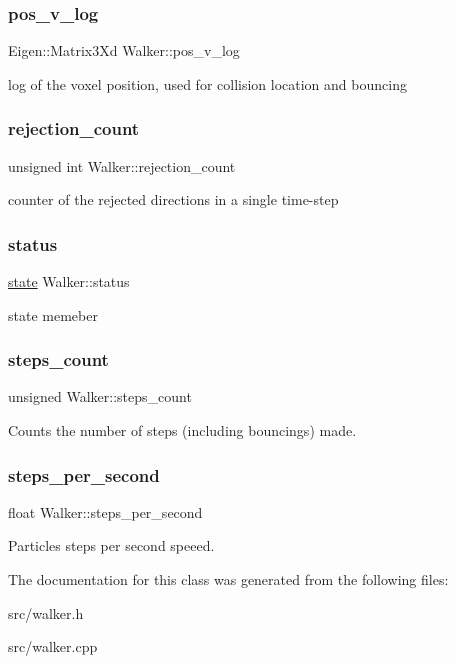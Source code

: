 \subsubsection{\texorpdfstring{pos\+\_\+v\+\_\+log}{pos\_v\_log}}
{\footnotesize\ttfamily Eigen\+::\+Matrix3\+Xd Walker\+::pos\+\_\+v\+\_\+log}

log of the voxel position, used for collision location and bouncing \mbox{\label{class_walker_a38669698192d39146c77011b69b1e372}} 
\subsubsection{\texorpdfstring{rejection\+\_\+count}{rejection\_count}}
{\footnotesize\ttfamily unsigned int Walker\+::rejection\+\_\+count}

counter of the rejected directions in a single time-\/step \mbox{\label{class_walker_afa37629b74387435a0bb02e0c061a718}} 
\subsubsection{\texorpdfstring{status}{status}}
{\footnotesize\ttfamily \hyperlink{class_walker_afcad3f5c11d0bd045de22fb0347dc44c}{state} Walker\+::status}

state memeber \mbox{\label{class_walker_a83536011f160b42f6c39f121ee550731}} 
\subsubsection{\texorpdfstring{steps\+\_\+count}{steps\_count}}
{\footnotesize\ttfamily unsigned Walker\+::steps\+\_\+count}

Counts the number of steps (including bouncings) made. \mbox{\label{class_walker_a7f33d06b7aa5fabf2a2ac15d119bbcc7}} 
\subsubsection{\texorpdfstring{steps\+\_\+per\+\_\+second}{steps\_per\_second}}
{\footnotesize\ttfamily float Walker\+::steps\+\_\+per\+\_\+second}

Particles steps per second speeed. 

The documentation for this class was generated from the following files\+:\begin{DoxyCompactItemize}
\item 
src/walker.\+h\item 
src/walker.\+cpp\end{DoxyCompactItemize}
